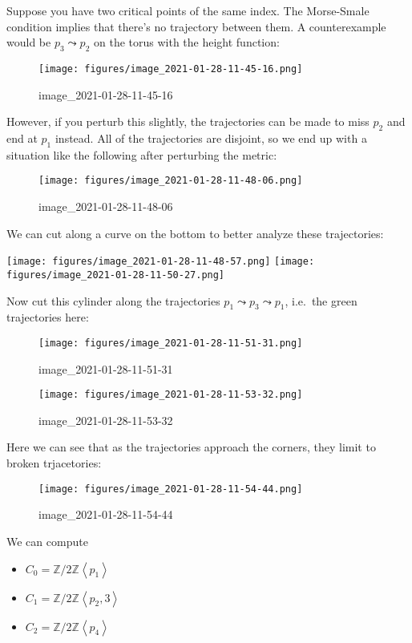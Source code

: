 \begin{example}

Suppose you have two critical points of the same index. The Morse-Smale
condition implies that there's no trajectory between them. A
counterexample would be \(p_3 \leadsto p_2\) on the torus with the
height function:

\begin{figure}
\centering
\texttt{[image: figures/image\_2021-01-28-11-45-16.png]}
\caption{image\_2021-01-28-11-45-16}
\end{figure}

However, if you perturb this slightly, the trajectories can be made to
miss \(p_2\) and end at \(p_1\) instead. All of the trajectories are
disjoint, so we end up with a situation like the following after
perturbing the metric:

\begin{figure}
\centering
\texttt{[image: figures/image\_2021-01-28-11-48-06.png]}
\caption{image\_2021-01-28-11-48-06}
\end{figure}

We can cut along a curve on the bottom to better analyze these
trajectories:

\texttt{[image: figures/image\_2021-01-28-11-48-57.png]}
\texttt{[image: figures/image\_2021-01-28-11-50-27.png]}

Now cut this cylinder along the trajectories
\(p_1\leadsto p_3 \leadsto p_1\), i.e.~the green trajectories here:

\begin{figure}
\centering
\texttt{[image: figures/image\_2021-01-28-11-51-31.png]}
\caption{image\_2021-01-28-11-51-31}
\end{figure}

\begin{figure}
\centering
\texttt{[image: figures/image\_2021-01-28-11-53-32.png]}
\caption{image\_2021-01-28-11-53-32}
\end{figure}

Here we can see that as the trajectories approach the corners, they
limit to broken trjacetories:

\begin{figure}
\centering
\texttt{[image: figures/image\_2021-01-28-11-54-44.png]}
\caption{image\_2021-01-28-11-54-44}
\end{figure}

We can compute

\begin{itemize}
\tightlist
\item
  \(C_0 = {\mathbb{Z}}/2{\mathbb{Z}}\left\langle{ p_1 }\right\rangle\)
\item
  \(C_1 = {\mathbb{Z}}/2{\mathbb{Z}}\left\langle{ p_2, 3 }\right\rangle\)
\item
  \(C_2 = {\mathbb{Z}}/2{\mathbb{Z}}\left\langle{ p_4 }\right\rangle\)
\end{itemize}


\end{example}
